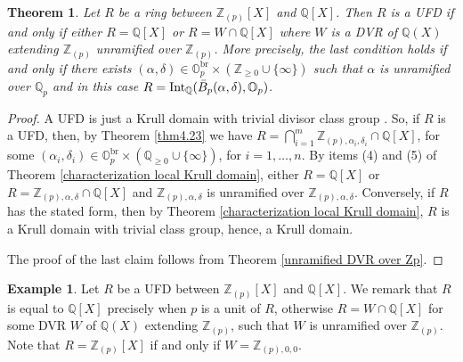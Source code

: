 \documentclass[10pt]{article}
\numberwithin{equation}{section}
\newtheorem{Thm}[equation]{Theorem}
\theoremstyle{definition}
\newtheorem{Ex}[equation]{Example}
\theoremstyle{definition}
\newcommand{\Q}{\mathbb{Q}}
\newcommand{\Z}{\mathbb{Z}}
\renewcommand{\O}{\mathbb{O}}
\newcommand{\Int}{\textnormal{Int}}
\newcommand{\IntQ}{\Int_{\Q}}
\newcommand{\br}{\text{br}}
\newcommand\rc { \color{red}}
\begin{document}
\begin{Thm}\label{intersection DVR is UFD}
Let $R$ be a ring between $\Z_{(p)}[X]$ and $\Q[X]$. Then $R$ is a UFD if and only if either $R=\Q[X]$ or $R=W\cap\Q[X]$ where $W$ is a DVR of $\Q(X)$ extending $\Z_{(p)}$ unramified over $\Z_{(p)}$. More precisely, the last condition holds if and only if  there exists $(\alpha,\delta)\in\O_p^{\br}\times(\Z_{\geq0}\cup\{\infty\})$ such that $\alpha$ is unramified over $\Q_p$ and in this case $R=\IntQ(\bar B_p(\alpha,\delta),\O_p)$.    
\end{Thm}

\begin{proof}
A UFD is just a Krull domain with trivial divisor class group \cite[Proposition 6.1]{Fossum}. So, if $R$ is a UFD, then,  by Theorem \ref{thm4.23} we have $R=\bigcap\limits_{i=1}^m\Z_{(p),\alpha_i,\delta_i}\cap\Q[X]$, for some $(\alpha_i,\delta_i)\in\O_p^{\br}\times(\Q_{\geq0}\cup\{\infty\})$, for $i=1,\ldots,n$. By items (4) and (5) of Theorem \ref{characterization local Krull domain}, either $R=\Q[X]$ or $R=\Z_{(p),\alpha,\delta}\cap\Q[X]$ and $\Z_{(p),\alpha,\delta}$ is unramified over $\Z_{(p),\alpha,\delta}$. Conversely, if $R$ has the stated form,  then by Theorem \ref{characterization local Krull domain}, $R$ is a Krull domain with trivial class group, hence, a Krull domain.

The proof of the last claim follows from Theorem \ref{unramified DVR over Zp}.
\end{proof}




\begin{Ex}
 Let $R$ be a UFD between $\Z_{(p)}[X]$ and $\Q[X]$. We remark that $R$ is equal to $\Q[X]$ precisely when $p$ is a unit of $R$, otherwise $R=W\cap \Q[X]$ for some DVR $W$ of $\Q(X)$ extending $\Z_{(p)}$, such that $W$ is unramified over $\Z_{(p)}$. Note that $R=\Z_{(p)}[X]$ if and only if $W=\Z_{(p),0,0}$. 
\end{Ex}
\end{document}
